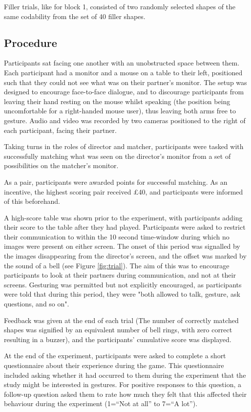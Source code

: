 \documentclass[a4paper,man,natbib]{apa6}
\begin{document}
Filler trials, like for block 1, consisted of two randomly selected shapes of the same codability from the set of 40 filler shapes. 


\subsection{Procedure}
Participants sat facing one another with an unobstructed space between them.
Each participant had a monitor and a mouse on a table to their left, positioned such that they could not see what was on their partner's monitor.
The setup was designed to encourage face-to-face dialogue, and to discourage participants from leaving their hand resting on the mouse whilst speaking (the position being uncomfortable for a right-handed mouse user), thus leaving both arms free to gesture.
Audio and video was recorded by two cameras positioned to the right of each participant, facing their partner.

Taking turns in the roles of director and matcher, participants were tasked with successfully matching what was seen on the director's monitor from a set of possibilities on the matcher's monitor.

As a pair, participants were awarded points for successful matching.
As an incentive, the highest scoring pair received \pounds 40, and participants were informed of this beforehand.

A high-score table was shown prior to the experiment, with participants adding their score to the table after they had played.
Participants were asked to restrict their communication to within the 10 second time-window during which no images were present on either screen. 
The onset of this period was signalled by the images disappearing from the director's screen, and the offset was marked by the sound of a bell (see Figure \ref{fig:trial}).
The aim of this was to encourage participants to look at their partners during communication, and not at their screens. 
Gesturing was permitted but not explicitly encouraged, as participants were told that during this period, they were "both allowed to talk, gesture, ask questions, and so on".

Feedback was given at the end of each trial (The number of correctly matched shapes was signified by an equivalent number of bell rings, with zero correct resulting in a buzzer), and the participants' cumulative score was displayed.

At the end of the experiment, participants were asked to complete a short questionnaire about their experience during the game.
This questionnaire included asking whether it had occurred to them during the experiment that the study might be interested in gestures.
For positive responses to this question, a follow-up question asked them to rate how much they felt that this affected their behaviour during the experiment (1=``Not at all'' to 7=``A lot'').
\end{document}
